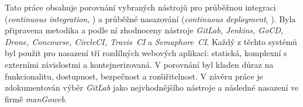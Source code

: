 Tato práce obsahuje porovnání vybraných nástrojů pro průběžnou integraci (\textit{continuous integration}, \CI) a průběžné nasazování (\textit{continuous deployment}, \CD). Byla připravena metodika a podle ní zhodnoceny nástroje \textit{GitLab, Jenkins, GoCD, Drone, Concourse, CircleCI, Travis~CI} a \textit{Semaphore~CI}. Každý z těchto systémů byl použit pro nasazení tří rozdílných webových aplikací: statická, komplexní s externími závislostmi a kontejnerizovaná. V porovnání byl kladen důraz na funkcionalitu, dostupnost, bezpečnost a rozšiřitelnost. V závěru práce je zdokumentován výběr \textit{GitLab} jako nejvhodnějšího nástroje a následné nasazení \CICD ve firmě \textit{manGoweb}.
